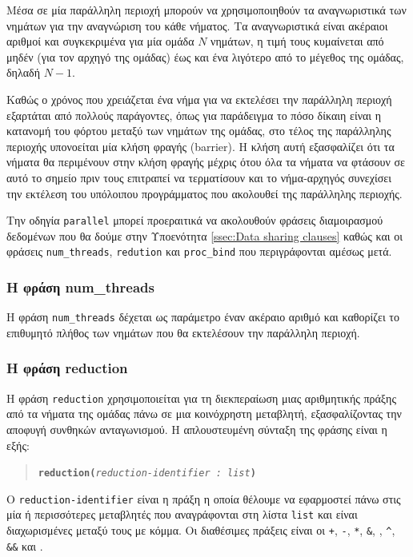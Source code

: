 Μέσα σε μία παράλληλη περιοχή μπορούν να χρησιμοποιηθούν τα αναγνωριστικά των νημάτων για την αναγνώριση του κάθε νήματος. Τα αναγνωριστικά είναι ακέραιοι αριθμοί και συγκεκριμένα για μία ομάδα $N$ νημάτων, η τιμή τους κυμαίνεται από μηδέν (για τον αρχηγό της ομάδας) έως και ένα λιγότερο από το μέγεθος της ομάδας, δηλαδή $N-1$.

Καθώς ο χρόνος που χρειάζεται ένα νήμα για να εκτελέσει την παράλληλη περιοχή εξαρτάται από πολλούς παράγοντες, όπως για παράδειγμα το πόσο δίκαιη είναι η κατανομή του φόρτου μεταξύ των νημάτων της ομάδας, στο τέλος της παράλληλης περιοχής υπονοείται μία κλήση φραγής (barrier). Η κλήση αυτή εξασφαλίζει ότι τα νήματα θα περιμένουν στην κλήση φραγής μέχρις ότου όλα τα νήματα να φτάσουν σε αυτό το σημείο πριν τους επιτραπεί να τερματίσουν και το νήμα-αρχηγός συνεχίσει την εκτέλεση του υπόλοιπου προγράμματος που ακολουθεί της παράλληλης περιοχής.

Την οδηγία \texttt{parallel} μπορεί προεραιτικά να ακολουθούν φράσεις διαμοιρασμού δεδομένων που θα δούμε στην Υποενότητα \ref{ssec:Data sharing clauses} καθώς και οι φράσεις \texttt{num\_threads}, \texttt{redution} και \texttt{proc\_bind} που περιγράφονται αμέσως μετά.

\subsubsection{Η φράση num\_threads}
Η φράση \texttt{num\_threads} δέχεται ως παράμετρο έναν ακέραιο αριθμό και καθορίζει το επιθυμητό πλήθος των νημάτων που θα εκτελέσουν την παράλληλη περιοχή.

\subsubsection{Η φράση reduction}
Η φράση \texttt{reduction} χρησιμοποιείται για τη διεκπεραίωση μιας αριθμητικής πράξης από τα νήματα της ομάδας πάνω σε μια κοινόχρηστη μεταβλητή, εξασφαλίζοντας την αποφυγή συνθηκών ανταγωνισμού. Η απλουστευμένη σύνταξη της φράσης είναι η εξής:
\begin{quote}
	\texttt{\textbf{reduction(}\textit{reduction-identifier : list}\textbf{)}}
\end{quote}

Ο \texttt{reduction-identifier} είναι η πράξη η οποία θέλουμε να εφαρμοστεί πάνω στις μία ή περισσότερες μεταβλητές που αναγράφονται στη λίστα \texttt{list} και είναι διαχωρισμένες μεταξύ τους με κόμμα. Οι διαθέσιμες πράξεις είναι οι \texttt{+}, \texttt{-}, \texttt{*}, \texttt{\&}, \texttt{\textbar}, \texttt{\string^}, \texttt{\&\&} και \texttt{\textbar\textbar}.

